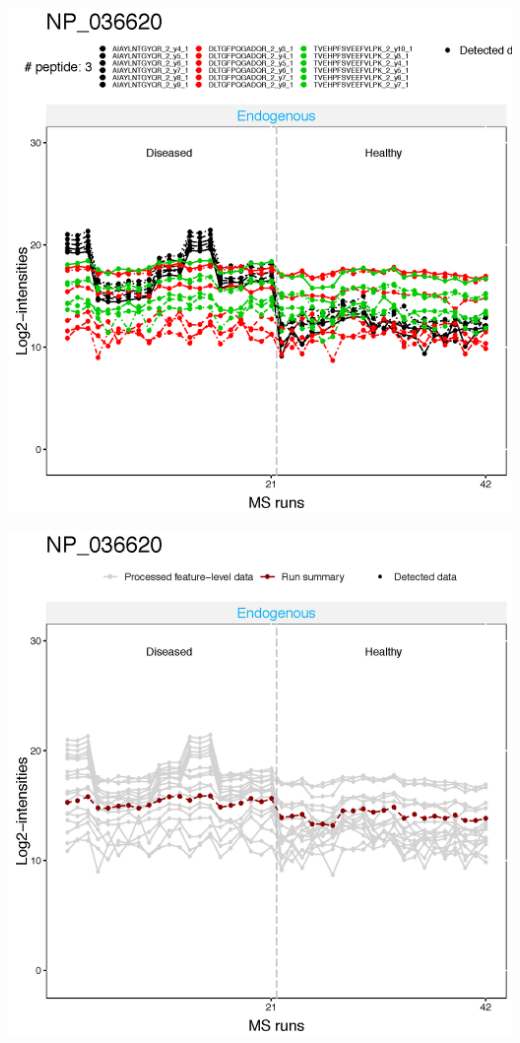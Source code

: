 \documentclass[]{book}
\begin{document}
\includegraphics{img/MSstats_ProfilePlot_36620.png}

\includegraphics{img/MSstats_ProfilePlot_wSummarization_36620.png}
\end{document}
